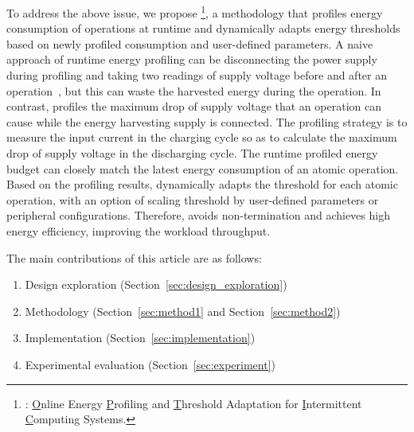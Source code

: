 To address the above issue, we propose \nn{}\footnote{\nn{}: \underline{O}nline Energy \underline{P}rofiling and \underline{T}hreshold Adaptation for \underline{I}ntermittent \underline{C}omputing Systems. }, a methodology that profiles energy consumption of operations at runtime and dynamically adapts energy thresholds based on newly profiled consumption and user-defined parameters. 
A naive approach of runtime energy profiling can be disconnecting the power supply during profiling and taking two readings of supply voltage before and after an operation~\cite{zhan2020adaptive}, but this can waste the harvested energy during the operation. 
In contrast, \nn{} profiles the maximum drop of supply voltage that an operation can cause while the energy harvesting supply is connected. 
The profiling strategy is to measure the input current in the charging cycle so as to calculate the maximum drop of supply voltage in the discharging cycle. 
The runtime profiled energy budget can closely match the latest energy consumption of an atomic operation. 
Based on the profiling results, \nn{} dynamically adapts the threshold for each atomic operation, with an option of scaling threshold by user-defined parameters or peripheral configurations.
Therefore, \nn{} avoids non-termination and achieves high energy efficiency, improving the workload throughput.

The main contributions of this article are as follows:

\begin{enumerate}
    \item Design exploration (Section~\ref{sec:design_exploration})
    \item Methodology (Section~\ref{sec:method1} and Section~\ref{sec:method2})
    \item Implementation (Section~\ref{sec:implementation})
    \item Experimental evaluation (Section~\ref{sec:experiment})
\end{enumerate}